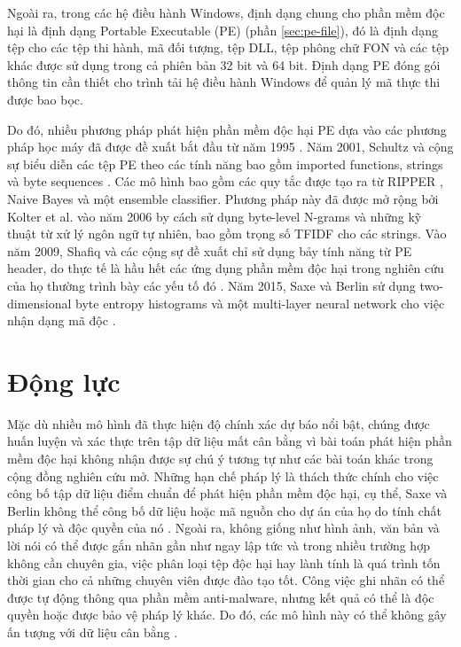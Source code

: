 Ngoài ra, trong các hệ điều hành Windows, định dạng chung cho phần mềm độc hại là định dạng Portable Executable (PE) (phần \ref{sec:pe-file}), đó là định dạng tệp cho các tệp thi hành, mã đối tượng, tệp DLL, tệp phông chữ FON và các tệp khác được sử dụng trong cả phiên bản 32 bit và 64 bit. Định dạng PE đóng gói thông tin cần thiết cho trình tải hệ điều hành Windows để quản lý mã thực thi được bao bọc.

Do đó, nhiều phương pháp phát hiện phần mềm độc hại PE dựa vào các phương pháp học máy đã được đề xuất bắt đầu từ năm 1995 \cite{kephart1995biologically,schultz2001data,kolter2006learning,Shafiq2009AFF,saxe2015deep}.
Năm 2001, Schultz và cộng sự biểu diễn các tệp PE theo các tính năng bao gồm imported functions, strings và byte sequences \cite{schultz2001data}. 
Các mô hình bao gồm các quy tắc được tạo ra từ RIPPER \cite{cohen1995fast}, Naive Bayes và một ensemble classifier.
Phương pháp này đã được mở rộng bởi Kolter et al. vào năm 2006 \cite{kolter2006learning} by cách sử dụng byte-level N-grams và những kỹ thuật từ xử lý ngôn ngữ tự nhiên, bao gồm trọng số TFIDF cho các strings. 
Vào năm 2009, Shafiq và các cộng sự đề xuất chỉ sử dụng bảy tính năng từ PE header, do thực tế là hầu hết các ứng dụng phần mềm độc hại trong nghiên cứu của họ thường trình bày các yếu tố đó \cite{Shafiq2009AFF}. 
Năm 2015, Saxe và Berlin sử dụng two-dimensional byte entropy histograms và một multi-layer neural network cho việc nhận dạng mã độc \cite{saxe2015deep}.

\section{Động lực}
\label{sec:motivation}

Mặc dù nhiều mô hình đã thực hiện độ chính xác dự báo nổi bật, chúng được huấn luyện và xác thực trên tập dữ liệu mất cân bằng vì bài toán phát hiện phần mềm độc hại không nhận được sự chú ý tương tự như các bài toán khác trong cộng đồng nghiên cứu mở. 
Những hạn chế pháp lý là thách thức chính cho việc công bố tập dữ liệu điểm chuẩn để phát hiện phần mềm độc hại, cụ thể, Saxe và Berlin không thể công bố dữ liệu hoặc mã nguồn cho dự án của họ do tính chất pháp lý và độc quyền của nó \cite{saxe2015deep}. 
Ngoài ra, không giống như hình ảnh, văn bản và lời nói có thể được gắn nhãn gần như ngay lập tức và trong nhiều trường hợp không cần chuyên gia, việc phân loại tệp độc hại hay lành tính là quá trình tốn thời gian cho cả những chuyên viên được đào tạo tốt.
Công việc ghi nhãn có thể được tự động thông qua phần mềm anti-malware, nhưng kết quả có thể là độc quyền hoặc được bảo vệ pháp lý khác. 
Do đó, các mô hình này có thể không gây ấn tượng với dữ liệu cân bằng \cite{chawla2009data}.

